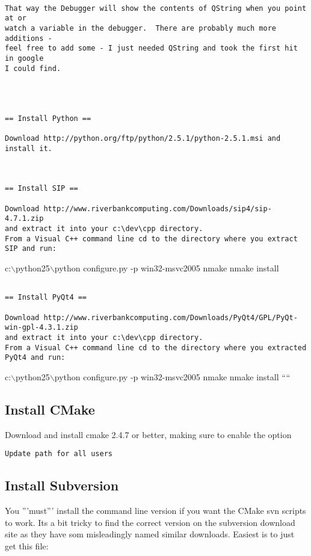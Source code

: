 \begin{verbatim}

That way the Debugger will show the contents of QString when you point at or
watch a variable in the debugger.  There are probably much more additions -
feel free to add some - I just needed QString and took the first hit in google
I could find.



  
== Install Python ==

Download http://python.org/ftp/python/2.5.1/python-2.5.1.msi and install it.



== Install SIP ==

Download http://www.riverbankcomputing.com/Downloads/sip4/sip-4.7.1.zip 
and extract it into your c:\dev\cpp directory.
From a Visual C++ command line cd to the directory where you extract SIP and run:

\end{verbatim}
c:$\backslash$python25$\backslash$python configure.py -p win32-msvc2005
nmake
nmake install

\begin{verbatim}

== Install PyQt4 ==

Download http://www.riverbankcomputing.com/Downloads/PyQt4/GPL/PyQt-win-gpl-4.3.1.zip 
and extract it into your c:\dev\cpp directory.
From a Visual C++ command line cd to the directory where you extracted PyQt4 and run:

\end{verbatim}
c:$\backslash$python25$\backslash$python configure.py -p win32-msvc2005
nmake
nmake install
````

\subsection{Install CMake}
Download and install cmake 2.4.7 or better, making sure to enable the 
option

\begin{verbatim}
Update path for all users
\end{verbatim}

\subsection{Install Subversion}
You '''must''' install the command line version if you want the CMake svn scripts to work.
Its a bit tricky to find the correct version on the subversion download site as they have 
som misleadingly named similar downloads. Easiest is to just get this file:

